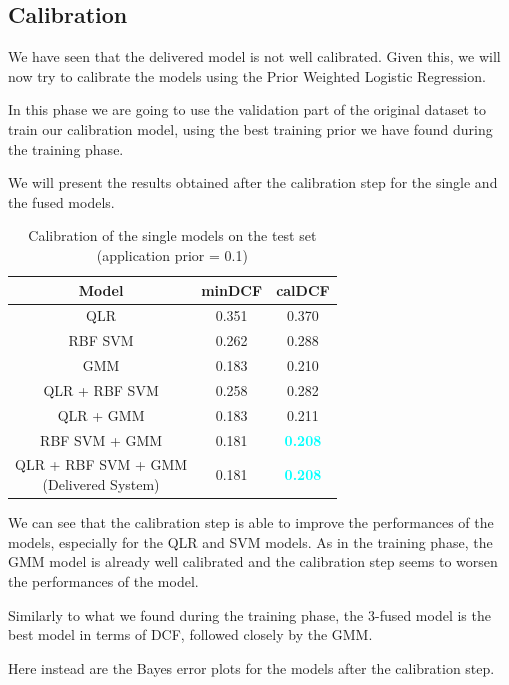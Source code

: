 \documentclass[12pt]{report}
\newcommand{\nnl}{%
    \newline
    \newline
}
\newcommand{\nl}{%
    \newline
    \noindent
}
\begin{document}
\subsection*{Calibration}
We have seen that the delivered model is not well calibrated. Given this, we will now try to calibrate the models using the Prior Weighted Logistic Regression.
\nl
In this phase we are going to use the validation part of the original dataset to train our calibration model, using the best training prior we have found during the training phase.
\nl
We will present the results obtained after the calibration step for the single and the fused models.
\begin{table}[H]
    \centering
    \begin{tabular}{|c|c|c|}
        \hline
        \rowcolor{blue!10}
        \textbf{Model} & \textbf{minDCF} & \textbf{calDCF}                  \\
        \hline
        QLR            & 0.351           & 0.370                            \\
        \hline
        RBF SVM        & 0.262           & 0.288                            \\
        \hline
        GMM            & 0.183           & 0.210                            \\
        \hline
        QLR + RBF SVM  & 0.258           & 0.282                            \\
        \hline
        QLR + GMM      & 0.183           & 0.211                            \\
        \hline
        RBF SVM + GMM  & 0.181           & \textcolor{cyan}{\textbf{0.208}} \\
        \hline
        \makecell{QLR + RBF SVM + GMM                                       \\ (Delivered System)} & 0.181        &   \textcolor{cyan}{\textbf{0.208}}                 \\
        \hline
    \end{tabular}
    \caption{Calibration of the single models on the test set (application prior = 0.1)}
    \label{tab:calibration_single_models}
\end{table}
\noindent
We can see that the calibration step is able to improve the performances of the models, especially for the QLR and SVM models. As in the training phase, the GMM model is already well calibrated and the calibration step seems to worsen the performances of the model.
\nl
Similarly to what we found during the training phase, the 3-fused model is the best model in terms of DCF, followed closely by the GMM.
\nnl
Here instead are the Bayes error plots for the models after the calibration step.
\end{document}
